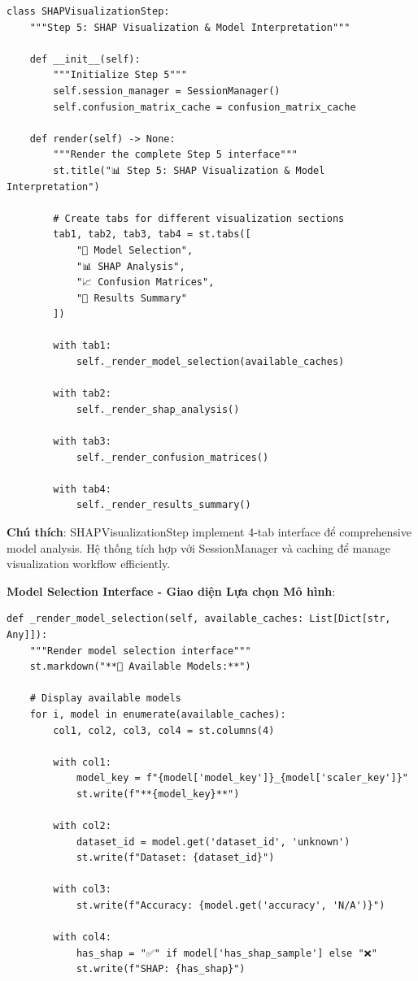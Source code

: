 \begin{verbatim}
class SHAPVisualizationStep:
    """Step 5: SHAP Visualization & Model Interpretation"""
    
    def __init__(self):
        """Initialize Step 5"""
        self.session_manager = SessionManager()
        self.confusion_matrix_cache = confusion_matrix_cache
    
    def render(self) -> None:
        """Render the complete Step 5 interface"""
        st.title("📊 Step 5: SHAP Visualization & Model Interpretation")
        
        # Create tabs for different visualization sections
        tab1, tab2, tab3, tab4 = st.tabs([
            "🎯 Model Selection", 
            "📊 SHAP Analysis", 
            "📈 Confusion Matrices", 
            "💾 Results Summary"
        ])
        
        with tab1:
            self._render_model_selection(available_caches)
        
        with tab2:
            self._render_shap_analysis()
        
        with tab3:
            self._render_confusion_matrices()
        
        with tab4:
            self._render_results_summary()
\end{verbatim}

\textbf{Chú thích}: SHAPVisualizationStep implement 4-tab interface để comprehensive model analysis. Hệ thống tích hợp với SessionManager và caching để manage visualization workflow efficiently.

\textbf{Model Selection Interface - Giao diện Lựa chọn Mô hình}:

\begin{verbatim}
def _render_model_selection(self, available_caches: List[Dict[str, Any]]):
    """Render model selection interface"""
    st.markdown("**🎯 Available Models:**")
    
    # Display available models
    for i, model in enumerate(available_caches):
        col1, col2, col3, col4 = st.columns(4)
        
        with col1:
            model_key = f"{model['model_key']}_{model['scaler_key']}"
            st.write(f"**{model_key}**")
        
        with col2:
            dataset_id = model.get('dataset_id', 'unknown')
            st.write(f"Dataset: {dataset_id}")
        
        with col3:
            st.write(f"Accuracy: {model.get('accuracy', 'N/A')}")
        
        with col4:
            has_shap = "✅" if model['has_shap_sample'] else "❌"
            st.write(f"SHAP: {has_shap}")
\end{verbatim}

